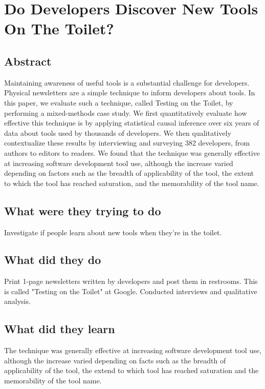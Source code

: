 \section{Do Developers Discover New Tools On The Toilet?}

\subsection{Abstract}

Maintaining awareness of useful tools is a substantial challenge for developers. Physical newsletters are a simple technique to inform developers about tools. In this paper, we evaluate such a technique, called Testing on the Toilet, by performing a mixed-methods case study. We first quantitatively evaluate how effective this technique is by applying statistical causal inference over six years of data about tools used by thousands of developers. We then qualitatively contextualize these results by interviewing and surveying 382 developers, from authors to editors to readers. We found that the technique was generally effective at increasing software development tool use, although the increase varied depending on factors such as the breadth of applicability of the tool, the extent to which the tool has reached saturation, and the memorability of the tool name.

\subsection{What were they trying to do}

Investigate if people learn about new tools when they're in the toilet.

\subsection{What did they do}

Print 1-page newsletters written by developers and post them in restrooms. This is called "Testing on the Toilet" at Google. Conducted interviews and qualitative analysis.

\subsection{What did they learn}

The technique was generally effective at increasing software development tool use, although the increase varied depending on facts such as the breadth of applicability of the tool, the extend to which tool has reached saturation and the memorability of the tool name.


